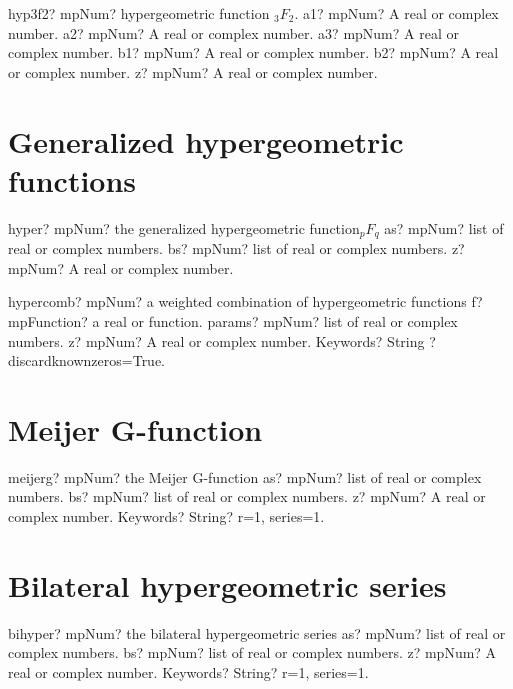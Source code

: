 \documentclass[12pt,a4paper,openany]{book}
\begin{document}
\begin{mpFunctionsExtract}
\mpFunctionSix
{hyp3f2? mpNum? hypergeometric function ${}_3F_2$.}
{a1? mpNum? A real or complex number.}
{a2? mpNum? A real or complex number.}
{a3? mpNum? A real or complex number.}
{b1? mpNum? A real or complex number.}
{b2? mpNum? A real or complex number.}
{z? mpNum? A real or complex number.}
\end{mpFunctionsExtract}

\section{Generalized hypergeometric functions}

\begin{mpFunctionsExtract}
\mpFunctionThree
{hyper? mpNum? the generalized hypergeometric function${}_pF_q$}
{as? mpNum? list of real or complex numbers.}
{bs? mpNum? list of real or complex numbers.}
{z? mpNum? A real or complex number.}
\end{mpFunctionsExtract}

\begin{mpFunctionsExtract}
\mpFunctionFour
{hypercomb? mpNum? a weighted combination of hypergeometric functions}
{f? mpFunction? a real or function.}
{params? mpNum? list of real or complex numbers.}
{z? mpNum? A real or complex number.}
{Keywords? String ? discardknownzeros=True.}
\end{mpFunctionsExtract}

\section{Meijer G-function}

\begin{mpFunctionsExtract}
\mpFunctionFour
{meijerg? mpNum? the  Meijer G-function}
{as? mpNum? list of real or complex numbers.}
{bs? mpNum? list of real or complex numbers.}
{z? mpNum? A real or complex number.}
{Keywords? String?  r=1, series=1.}
\end{mpFunctionsExtract}

\section{Bilateral hypergeometric series}

\begin{mpFunctionsExtract}
\mpFunctionFour
{bihyper? mpNum? the  bilateral hypergeometric series}
{as? mpNum? list of real or complex numbers.}
{bs? mpNum? list of real or complex numbers.}
{z? mpNum? A real or complex number.}
{Keywords? String?  r=1, series=1.}
\end{mpFunctionsExtract}
\end{document}
